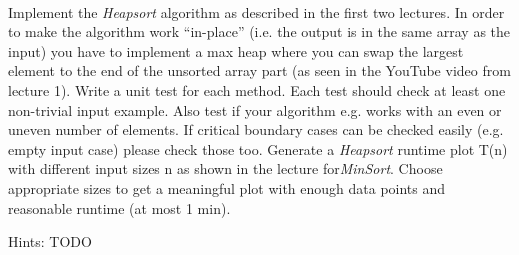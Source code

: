  \\
Implement the \textit{Heapsort} algorithm as described in the first two
lectures.
In order to make the algorithm work \enquote{in-place}
(i.e. the output is in the same array as the input)
you have to implement a max heap where you can
swap the largest element to the end of the unsorted array part
(as seen in the YouTube video from lecture 1).
Write a unit test for each method.  Each test should check at least one
non-trivial input example.  Also test if your algorithm e.g. works with an
even or uneven number of elements. If critical boundary cases
can be checked easily (e.g. empty input case) please check those too.
Generate a \textit{Heapsort} runtime plot T(n) with different input sizes n
as shown in the lecture for\textit{MinSort}.
Choose appropriate sizes to get a meaningful plot with enough data points and
reasonable runtime (at most 1 min).\\\vspace{3em}

Hints: TODO